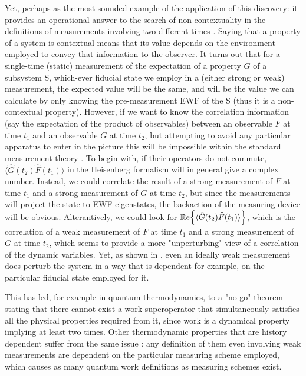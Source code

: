 \documentclass[11pt, a4paper]{article} %
\begin{document}
Yet, perhaps as the most sounded example of the application of this discovery: it provides an operational answer to the search of non-contextuality in the definitions of measurements involving two different times \cite{DevInPosition1}. Saying that a property of a system is contextual means that its value depends on the environment employed to convey that information to the observer. It turns out that for a single-time (static) measurement of the expectation of a property $G$ of a subsystem S, which-ever fiducial state we employ in a (either strong or weak) measurement, the expected value will be the same, and will be the value we can calculate by only knowing the pre-measurement EWF of the S (thus it is a non-contextual property). However, if we want to know the correlation information (say the expectation of the product of observables) between an observable $F$ at time $t_1$ and an observable $G$ at time $t_2$, but attempting to avoid any particular apparatus to enter in the picture this will be impossible within the standard measurement theory \cite{DevInPosition1, DevInPosition2, spin}. To begin with, if their operators do not commute, $\langle \hat{G}(t_2)\hat{F}(t_1)\rangle$ in the Heisenberg formalism will in general give a complex number. Instead, we could correlate the result of a strong measurement of $F$ at time $t_1$ and a strong measurement of $G$ at time $t_2$, but since the measurements will project the state to EWF eigenstates, the backaction of the measuring device will be obvious. Alterantively, we could look for $\mathbb{R}e \qty{\langle \hat{G}(t_2)\hat{F}(t_1)\rangle}$, which is the correlation of a weak measurement of $F$ at time $t_1$ and a strong measurement of $G$ at time $t_2$, which seems to provide a more "unperturbing" view of a correlation of the dynamic variables. Yet, as shown in \cite{spin}, even an ideally weak measurement does perturb the system in a way that is dependent for example, on the particular fiducial state employed for it.

This has led, for example in quantum thermodynamics, to a "no-go" theorem \cite{nogo} stating that there cannot exist a work superoperator that simultaneously satisfies all the physical properties required from it, since work is a dynamical property implying at least two times. Other thermodynamic properties that are history dependent suffer from the same issue \cite{workPb1, workPb2}: any definition of them even involving weak measurements are dependent on the particular measuring scheme employed, which causes as many quantum work definitions as measuring schemes exist.
\end{document}
